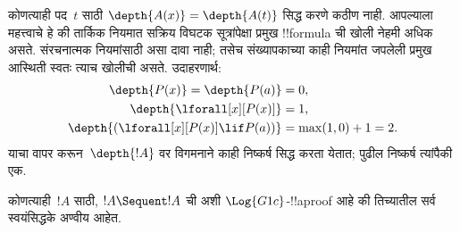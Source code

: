\documentclass[../../../include/open-logic-section]{subfiles}
\begin{document}
कोणत्याही पद~$t$ साठी $\depth{A(x)} =
\depth{A(t)}$ सिद्ध करणे कठीण नाही. आपल्याला
महत्त्वाचे हे की तार्किक नियमात सक्रिय विघटक सूत्रांपेक्षा प्रमुख
!!{formula} ची खोली नेहमी अधिक असते. संरचनात्मक
नियमांसाठी असा दावा नाही; तसेच संख्यापकाच्या काही
 नियमांत जपलेली प्रमुख आस्थिती स्वतः त्याच
खोलीची असते. उदाहरणार्थ:
\begin{align*}
\depth{P(x)} = \depth{P(a)} & = 0,\\
\depth{\lforall[x][P(x)]} & = 1,\\
\depth{(\lforall[x][P(x)] \lif P(a))} & = \max(1,0) + 1 = 2.
\end{align*}
याचा वापर करून~$\depth{!A}$ वर विगमनाने काही
निष्कर्ष सिद्ध करता येतात; पुढील निष्कर्ष त्यांपैकी एक.

\begin{prop}
कोणत्याही~$!A$ साठी, $!A \Sequent !A$ ची अशी
$\Log{G1c}$-!!a{proof} आहे की तिच्यातील सर्व
स्वयंसिद्धके अण्वीय आहेत.
\end{prop}
\end{document}
